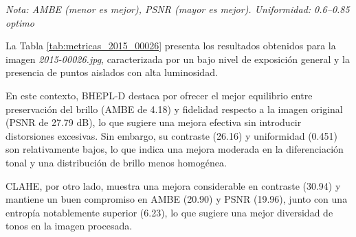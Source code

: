 \documentclass[sigchi]{acmart}
\begin{document}
\begin{table}[H]
	\centering
	\caption{Métricas de calidad para la imagen 2015\_00026.jpg}
	\label{tab:metricas_2015_00026}
	\vspace{0.5em}


	\vspace{0.5em}
	\footnotesize%
	\textit{Nota: AMBE (menor es mejor), PSNR (mayor es mejor). Uniformidad: 0.6–0.85 optimo}
\end{table}

La Tabla \ref{tab:metricas_2015_00026} presenta los resultados obtenidos para la imagen
\emph{2015-00026.jpg}, caracterizada por un bajo nivel de exposición general y la presencia de puntos
aislados con alta luminosidad.

En este contexto, BHEPL-D destaca por ofrecer el mejor equilibrio entre preservación del brillo
(AMBE de 4.18) y fidelidad respecto a la imagen original (PSNR de 27.79 dB), lo que sugiere una
mejora efectiva sin introducir distorsiones excesivas. Sin embargo, su contraste (26.16) y
uniformidad (0.451) son relativamente bajos, lo que indica una mejora moderada en la
diferenciación tonal y una distribución de brillo menos homogénea.

CLAHE, por otro lado, muestra una mejora considerable en contraste (30.94) y mantiene un buen
compromiso en AMBE (20.90) y PSNR (19.96), junto con una entropía notablemente superior (6.23),
lo que sugiere una mejor diversidad de tonos en la imagen procesada.
\end{document}
